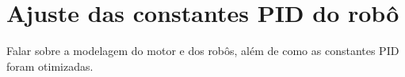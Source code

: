 \chapter{Ajuste das constantes PID do robô}\label{cap:pid}

Falar sobre a modelagem do motor e dos robôs, além de como as constantes PID foram otimizadas.




